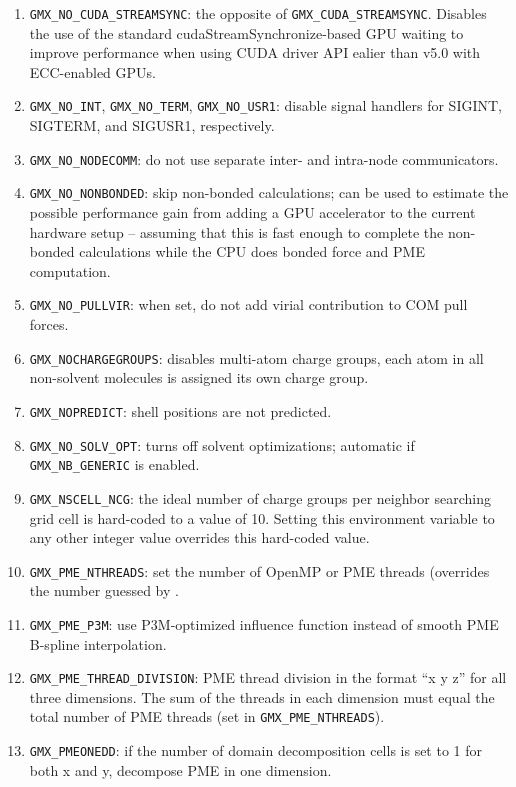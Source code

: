 \begin{enumerate}
\item   {\tt GMX_NO_CUDA_STREAMSYNC}: the opposite of {\tt GMX_CUDA_STREAMSYNC}. Disables the use of the
        standard cudaStreamSynchronize-based GPU waiting to improve performance when using CUDA driver API
        ealier than v5.0 with ECC-enabled GPUs.
\item   {\tt GMX_NO_INT}, {\tt GMX_NO_TERM}, {\tt GMX_NO_USR1}: disable signal handlers for SIGINT,
        SIGTERM, and SIGUSR1, respectively.
\item   {\tt GMX_NO_NODECOMM}: do not use separate inter- and intra-node communicators.
\item   {\tt GMX_NO_NONBONDED}: skip non-bonded calculations; can be used to estimate the possible
        performance gain from adding a GPU accelerator to the current hardware setup -- assuming that this is
        fast enough to complete the non-bonded calculations while the CPU does bonded force and PME computation.
\item   {\tt GMX_NO_PULLVIR}: when set, do not add virial contribution to COM pull forces.
\item   {\tt GMX_NOCHARGEGROUPS}: disables multi-atom charge groups, {\ie} each atom 
        in all non-solvent molecules is assigned its own charge group.
\item   {\tt GMX_NOPREDICT}: shell positions are not predicted.
\item   {\tt GMX_NO_SOLV_OPT}: turns off solvent optimizations; automatic if {\tt GMX_NB_GENERIC}
        is enabled.
\item   {\tt GMX_NSCELL_NCG}: the ideal number of charge groups per neighbor searching grid cell is hard-coded
        to a value of 10. Setting this environment variable to any other integer value overrides this hard-coded
        value.
\item   {\tt GMX_PME_NTHREADS}: set the number of OpenMP or PME threads (overrides the number guessed by 
        {\tt {}}.
\item   {\tt GMX_PME_P3M}: use P3M-optimized influence function instead of smooth PME B-spline interpolation.
\item   {\tt GMX_PME_THREAD_DIVISION}: PME thread division in the format ``x y z'' for all three dimensions. The
        sum of the threads in each dimension must equal the total number of PME threads (set in 
        {\tt GMX_PME_NTHREADS}).
\item   {\tt GMX_PMEONEDD}: if the number of domain decomposition cells is set to 1 for both x and y, 
        decompose PME in one dimension.

\end{enumerate}
